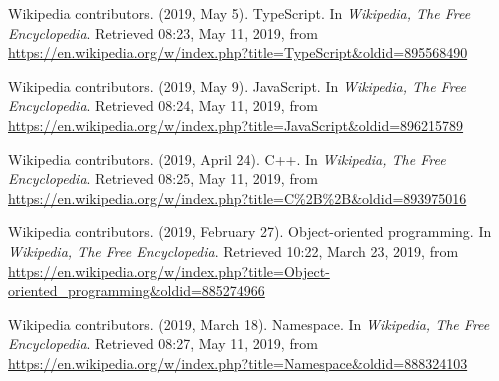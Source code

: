 \documentclass[a4paper]{report}
\begin{document}
\begin{thebibliography}{A}

Wikipedia contributors. (2019, May 5). TypeScript. In \emph{Wikipedia, The Free Encyclopedia}. Retrieved 08:23, May 11, 2019, from \url{https://en.wikipedia.org/w/index.php?title=TypeScript&oldid=895568490}

Wikipedia contributors. (2019, May 9). JavaScript. In \emph{Wikipedia, The Free Encyclopedia}. Retrieved 08:24, May 11, 2019, from \url{https://en.wikipedia.org/w/index.php?title=JavaScript&oldid=896215789}

Wikipedia contributors. (2019, April 24). C++. In \emph{Wikipedia, The Free Encyclopedia}. Retrieved 08:25, May 11, 2019, from \url{https://en.wikipedia.org/w/index.php?title=C%2B%2B&oldid=893975016}

Wikipedia contributors. (2019, February 27). Object-oriented programming. In \emph{Wikipedia, The Free Encyclopedia}. Retrieved 10:22, March 23, 2019, from \url{https://en.wikipedia.org/w/index.php?title=Object-oriented_programming&oldid=885274966}

Wikipedia contributors. (2019, March 18). Namespace. In \emph{Wikipedia, The Free Encyclopedia}. Retrieved 08:27, May 11, 2019, from \url{https://en.wikipedia.org/w/index.php?title=Namespace&oldid=888324103}
\end{thebibliography}
\end{document}
